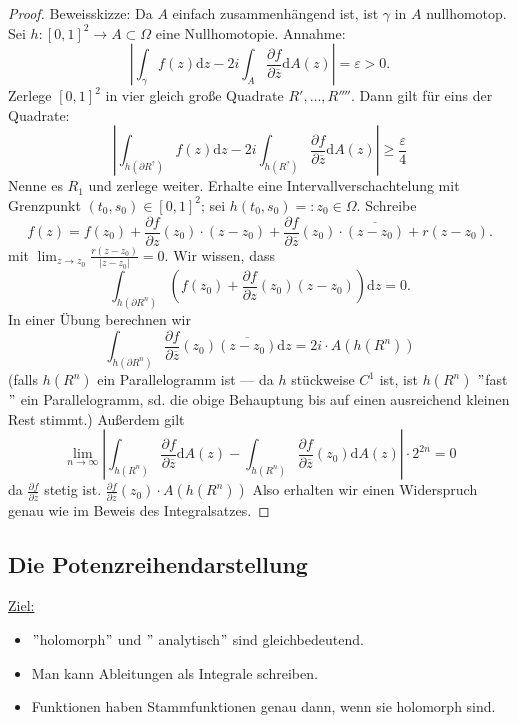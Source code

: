 \documentclass[11pt,titlepage]{article}
\theoremstyle{definition}
\theoremstyle{remark}
\begin{document}
	\begin{proof}
		Beweisskizze: Da $A$ einfach zusammenhängend ist, ist $\gamma$ in $A$ nullhomotop. \\
		Sei $h:[0,1]^2 \to A\subset\Omega$ eine Nullhomotopie. Annahme:
		\[ \left| \int_{\gamma}f(z)\mathrm{d}z -2i \int_A \frac{\partial f}{\partial \overline{z}}\mathrm{d} A(z)
		\right| =\varepsilon >0. \]
		Zerlege $[0,1]^2$ in vier gleich große Quadrate $R' ,\ldots ,R''''$. Dann gilt für eins der 
		Quadrate:
		\[ \left| \int_{h(\partial R^? )} f(z)\mathrm{d}z -2i \int_{h(R^?)}
		\frac{\partial f}{\partial \overline{z}}\mathrm{d} A(z) \right| \geq \frac{\varepsilon}{4} \]
		Nenne es $R_1$ und zerlege weiter. Erhalte eine Intervallverschachtelung mit Grenzpunkt 
		$(t_0, s_0)\in[0,1]^2$; sei $h(t_0,s_0) =:z_0\in\Omega$. Schreibe
		\[f(z)=f(z_0)+\frac{\partial f}{\partial z} (z_0)\cdot (z-z_0) +\frac{\partial f}{\partial \overline{z}}
		(z_0)\cdot \overline{(z-z_0)} +r(z-z_0). \]
		mit $\lim_{z\to z_0} \frac{r(z-z_0)}{|z-z_0|}=0$. Wir wissen, dass 
		\[ \int_{h(\partial R^n)} \left( f(z_0)+\frac{\partial f}{\partial z} (z_0)(z-z_0) \right) \mathrm{d}z =0. \]
		In einer Übung berechnen wir 
		\[ \int_{h(\partial R^n)}\frac{\partial f}{\partial \overline{z}}(z_0)\overline{(z-z_0)}\mathrm{d}z =
		2i\cdot A(h(R^n)) \]
		(falls $h(R^n)$ ein Parallelogramm ist — da $h$ stückweise $C^1$ ist, ist $h(R^n)$ $"$fast$"$ 
		ein Parallelogramm, sd. die obige Behauptung bis auf einen ausreichend kleinen Rest stimmt.)
		Außerdem gilt
		\[ \lim_{n\to\infty} \left| \int_{h(R^n)} \frac{\partial f}{\partial \overline{z}} \mathrm{d} A(z) - 
		\int_{h(R^n)} \frac{\partial f}{\partial \overline{z}}(z_0)\mathrm{d}A(z) \right| \cdot 2^{2n} =0 \]
		da $\frac{\partial f}{\partial \overline{z}}$ stetig ist. $\frac{\partial f}{\partial \overline{z}}(z_0) 
		\cdot A(h(R^n))$ Also erhalten wir einen Widerspruch genau wie im Beweis des Integralsatzes.
	\end{proof}
	
	\subsection{Die Potenzreihendarstellung}
	
	\underline{Ziel:} \begin{itemize} \item $"$holomorph$"$ und $"$ analytisch$"$ sind gleichbedeutend. 
	\item Man kann Ableitungen als Integrale schreiben.
	\item Funktionen haben Stammfunktionen genau dann, wenn sie holomorph sind.
	\end{itemize}
	
\end{document}
